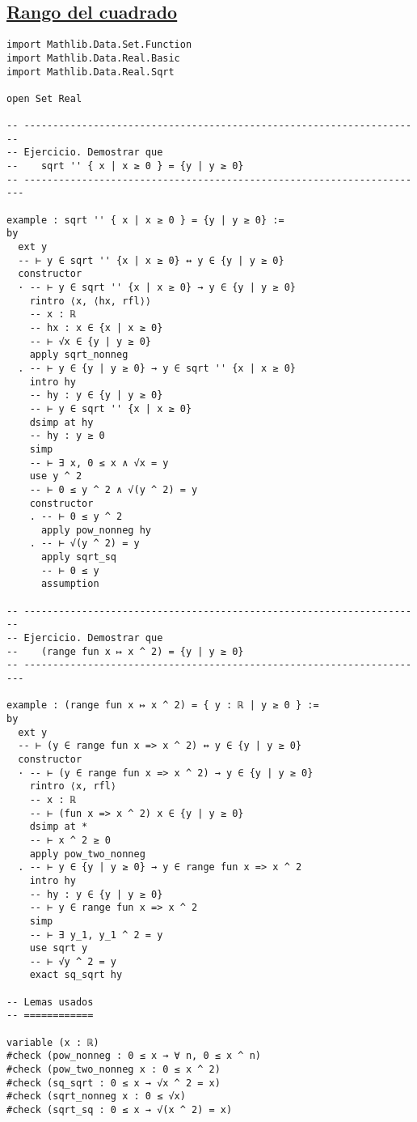\subsection{\href{./src/Conjuntos/Rango\_del\_cuadrado.lean}{Rango del cuadrado}}
\label{sec:org52667a0}
\begin{verbatim}
import Mathlib.Data.Set.Function
import Mathlib.Data.Real.Basic
import Mathlib.Data.Real.Sqrt

open Set Real

-- ---------------------------------------------------------------------
-- Ejercicio. Demostrar que
--    sqrt '' { x | x ≥ 0 } = {y | y ≥ 0}
-- ----------------------------------------------------------------------

example : sqrt '' { x | x ≥ 0 } = {y | y ≥ 0} :=
by
  ext y
  -- ⊢ y ∈ sqrt '' {x | x ≥ 0} ↔ y ∈ {y | y ≥ 0}
  constructor
  · -- ⊢ y ∈ sqrt '' {x | x ≥ 0} → y ∈ {y | y ≥ 0}
    rintro ⟨x, ⟨hx, rfl⟩⟩
    -- x : ℝ
    -- hx : x ∈ {x | x ≥ 0}
    -- ⊢ √x ∈ {y | y ≥ 0}
    apply sqrt_nonneg
  . -- ⊢ y ∈ {y | y ≥ 0} → y ∈ sqrt '' {x | x ≥ 0}
    intro hy
    -- hy : y ∈ {y | y ≥ 0}
    -- ⊢ y ∈ sqrt '' {x | x ≥ 0}
    dsimp at hy
    -- hy : y ≥ 0
    simp
    -- ⊢ ∃ x, 0 ≤ x ∧ √x = y
    use y ^ 2
    -- ⊢ 0 ≤ y ^ 2 ∧ √(y ^ 2) = y
    constructor
    . -- ⊢ 0 ≤ y ^ 2
      apply pow_nonneg hy
    . -- ⊢ √(y ^ 2) = y
      apply sqrt_sq
      -- ⊢ 0 ≤ y
      assumption

-- ---------------------------------------------------------------------
-- Ejercicio. Demostrar que
--    (range fun x ↦ x ^ 2) = {y | y ≥ 0}
-- ----------------------------------------------------------------------

example : (range fun x ↦ x ^ 2) = { y : ℝ | y ≥ 0 } :=
by
  ext y
  -- ⊢ (y ∈ range fun x => x ^ 2) ↔ y ∈ {y | y ≥ 0}
  constructor
  · -- ⊢ (y ∈ range fun x => x ^ 2) → y ∈ {y | y ≥ 0}
    rintro ⟨x, rfl⟩
    -- x : ℝ
    -- ⊢ (fun x => x ^ 2) x ∈ {y | y ≥ 0}
    dsimp at *
    -- ⊢ x ^ 2 ≥ 0
    apply pow_two_nonneg
  . -- ⊢ y ∈ {y | y ≥ 0} → y ∈ range fun x => x ^ 2
    intro hy
    -- hy : y ∈ {y | y ≥ 0}
    -- ⊢ y ∈ range fun x => x ^ 2
    simp
    -- ⊢ ∃ y_1, y_1 ^ 2 = y
    use sqrt y
    -- ⊢ √y ^ 2 = y
    exact sq_sqrt hy

-- Lemas usados
-- ============

variable (x : ℝ)
#check (pow_nonneg : 0 ≤ x → ∀ n, 0 ≤ x ^ n)
#check (pow_two_nonneg x : 0 ≤ x ^ 2)
#check (sq_sqrt : 0 ≤ x → √x ^ 2 = x)
#check (sqrt_nonneg x : 0 ≤ √x)
#check (sqrt_sq : 0 ≤ x → √(x ^ 2) = x)
\end{verbatim}

